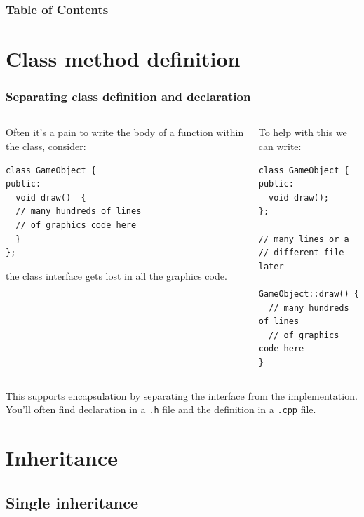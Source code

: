 \documentclass[handout]{beamer}
\subtitle{Session 5: Advanced object oriented programming}
\begin{document}
\frame{\titlepage}

\begin{frame}
\frametitle{Table of Contents}
\tableofcontents
\end{frame}

\section{Class method definition}

\begin{frame}[fragile]
  \frametitle{Separating class definition and declaration}
 
  \begin{columns}[t]
    \begin{column}[T]{0.5\linewidth}
  		Often it's a pain to write the body of a function within the class, consider:
  		\begin{lstlisting}
class GameObject {
public:
  void draw()  {
  // many hundreds of lines
  // of graphics code here
  }
};
  		\end{lstlisting}
  		the class interface gets lost in all the graphics code.
  	\end{column}
  	\pause
  	\begin{column}[T]{0.5\linewidth}
  		To help with this we can write:
		  \begin{lstlisting}
class GameObject {
public:
  void draw();
};

// many lines or a
// different file later

GameObject::draw() {
  // many hundreds of lines
  // of graphics code here
}
  		\end{lstlisting}
  	\end{column}
  \end{columns}
  \pause
  This supports encapsulation by separating the interface from the implementation.  You'll often find declaration in a \texttt{.h} file and the definition in a \texttt{.cpp} file.

\end{frame}

\section{Inheritance}

\subsection{Single inheritance}
\end{document}

